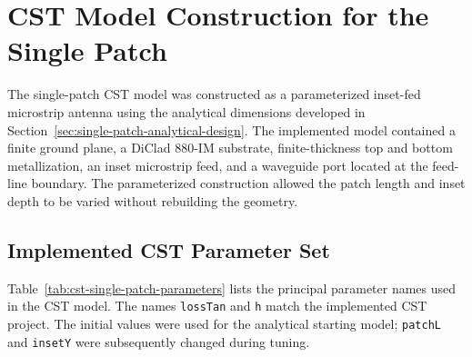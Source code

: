 \section{CST Model Construction for the Single Patch}
\label{sec:cst-single-patch-model}

The single-patch CST model was constructed as a parameterized inset-fed microstrip antenna using the
analytical dimensions developed in Section~\ref{sec:single-patch-analytical-design}. The implemented
model contained a finite ground plane, a DiClad 880-IM substrate, finite-thickness top and bottom
metallization, an inset microstrip feed, and a waveguide port located at the feed-line boundary. The
parameterized construction allowed the patch length and inset depth to be varied without rebuilding the
geometry.

\subsection{Implemented CST Parameter Set}
\label{subsec:cst-single-patch-parameter-set}

Table~\ref{tab:cst-single-patch-parameters} lists the principal parameter names used in the CST model.
The names \texttt{lossTan} and \texttt{h} match the implemented CST project. The initial values were
used for the analytical starting model; \texttt{patchL} and \texttt{insetY} were subsequently changed
during tuning.


